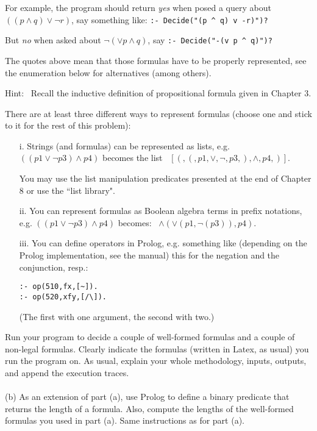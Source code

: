 \documentclass[fullapage,12pt]{article}
\begin{document}
For example, the program should return {\em yes} when posed a query about
$((p \wedge q)  \vee \neg r)$, say something like:  \verb+:- Decide("(p ^ q) v -r)")?+

But {\em no} when asked about $\neg (\vee p \wedge q)$, say \verb+:- Decide("-(v p ^ q)")?+

The quotes above mean that those formulas have to be properly represented, see the enumeration below for alternatives (among others).

\vspace{2mm}
\noindent Hint: \ Recall
the inductive definition of propositional formula given in Chapter 3.

There are at least three different ways to represent formulas (choose one and stick to it for the rest of this problem):

\newpage \vspace*{-1cm}
\begin{itemize}
\item[i.]  Strings (and formulas) can be represented as lists, e.g. $((p1 \vee \neg p3) \wedge p4)$ becomes the list \ $[(,(,p1,\vee, \neg, p3,), \wedge, p4,)]$. \

You may use the
list manipulation predicates presented at the end of Chapter 8 or use the ``list library".
\item[ii.] You can represent formulas as Boolean algebra terms in prefix notations, e.g. $((p1 \vee \neg p3) \wedge p4)$ becomes: \ $\wedge(\vee(p1,\neg(p3)),p4)$.
\item [iii.] You can define operators in Prolog, e.g. something like (depending on the Prolog implementation, see the manual) this for the negation and the conjunction, resp.:
\begin{verbatim}
:- op(510,fx,[~]).
:- op(520,xfy,[/\]).
\end{verbatim}
(The first with one argument, the second with two.)
\end{itemize}
Run your program to decide a couple of well-formed formulas and a couple of non-legal formulas. Clearly indicate the formulas (written in Latex, as usual) you run the program on. As usual,
explain your whole methodology, inputs, outputs, and append the execution  traces.\\
\\
(b) As an extension of part (a), use Prolog to define a binary predicate that returns the length of a formula. Also, compute the lengths of the well-formed formulas you used in part (a). Same instructions as for part (a).
\end{document}
